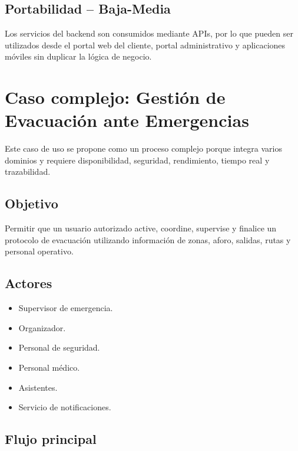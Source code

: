 \documentclass[12pt,a4paper]{article}
\begin{document}
\subsection{Portabilidad -- Baja-Media}

Los servicios del backend son consumidos mediante APIs, por lo que pueden ser utilizados desde el portal web del cliente, portal administrativo y aplicaciones móviles sin duplicar la lógica de negocio.

\section{Caso complejo: Gestión de Evacuación ante Emergencias}

Este caso de uso se propone como un proceso complejo porque integra varios dominios y requiere disponibilidad, seguridad, rendimiento, tiempo real y trazabilidad.

\subsection{Objetivo}

Permitir que un usuario autorizado active, coordine, supervise y finalice un protocolo de evacuación utilizando información de zonas, aforo, salidas, rutas y personal operativo.

\subsection{Actores}

\begin{itemize}
\item Supervisor de emergencia.
\item Organizador.
\item Personal de seguridad.
\item Personal médico.
\item Asistentes.
\item Servicio de notificaciones.
\end{itemize}

\subsection{Flujo principal}
\end{document}
